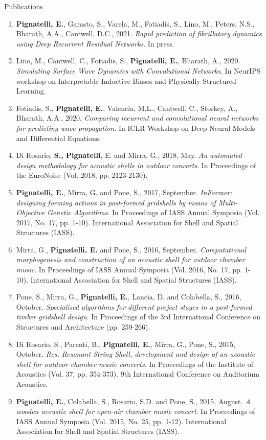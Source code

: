 \documentclass{resume}
\begin{document}
\begin{rSection}{Publications}
    \begin{enumerate}[leftmargin=0.45cm, itemsep=0em, topsep=0.5em, parsep=0.2em]
        \item \textbf{Pignatelli, E.}, Garasto, S., Varela, M., Fotiadis, S., Lino, M., Peters, N.S., Bharath, A.A., Cantwell, D.C., 2021. \textit{Rapid prediction of fibrillatory dynamics using Deep Recurrent Residual Networks}. In press.
        \item Lino, M., Cantwell, C., Fotiadis, S., \textbf{Pignatelli, E.}, Bharath, A., 2020. \textit{Simulating Surface Wave Dynamics with Convolutional Networks}. In NeurIPS workshop on Interpretable Inductive Biases and Physically Structured Learning.
        \item Fotiadis, S., \textbf{Pignatelli, E.}, Valencia, M.L., Cantwell, C., Storkey, A., Bharath, A.A., 2020. \textit{Comparing recurrent and convolutional neural networks for predicting wave propagation}. In ICLR Workshop on Deep Neural Models and Differential Equations.	
        \item Di Rosario, \textbf{S., Pignatelli}, E. and Mirra, G., 2018, May. \textit{An automated design methodology for acoustic shells in outdoor concerts}. In Proceedings of the EuroNoise (Vol. 2018, pp. 2123-2130).
        \item \textbf{Pignatelli, E.}, Mirra, G. and Pone, S., 2017, September. \textit{InFormer: designing forming actions in post-formed gridshells by means of Multi-Objective Genetic Algorithms}. In Proceedings of IASS Annual Symposia (Vol. 2017, No. 17, pp. 1-10). International Association for Shell and Spatial Structures (IASS).
        \item Mirra, G., \textbf{Pignatelli, E.} and Pone, S., 2016, September. \textit{Computational morphogenesis and construction of an acoustic shell for outdoor chamber music}. In Proceedings of IASS Annual Symposia (Vol. 2016, No. 17, pp. 1-10). International Association for Shell and Spatial Structures (IASS).
        \item Pone, S., Mirra, G., \textbf{Pignatelli, E.}, Lancia, D. and Colabella, S., 2016, October. \textit{Specialised algorithms for different project stages in a post-formed timber gridshell design}. In Proceedings of the 3rd International Conference on Structures and Architecture (pp. 259-266).
        \item Di Rosario, S., Parenti, B., \textbf{Pignatelli, E.}, Mirra, G., Pone, S., 2015, October. \textit{Res, Resonant String Shell, development and design of an acoustic shell for outdoor chamber music concerts}. In Proceedings of the Institute of Acoustics (Vol. 37, pp. 354-373). 9th International Conference on Auditorium Acoustics.
        \item \textbf{Pignatelli, E.}, Colabella, S., Rosario, S.D. and Pone, S., 2015, August. \textit{A wooden acoustic shell for open-air chamber music concert}. In Proceedings of IASS Annual Symposia (Vol. 2015, No. 25, pp. 1-12). International Association for Shell and Spatial Structures (IASS).
    \end{enumerate}
    \end{rSection}
    
\end{document}
